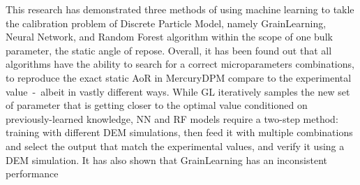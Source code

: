 This research has demonstrated three methods of using machine learning to takle the calibration problem of Discrete Particle Model, namely GrainLearning, Neural Network, and Random Forest algorithm within the scope of one bulk parameter, the static angle of repose. Overall, it has been found out that all algorithms have the ability to search for a correct microparameters combinations, to reproduce the exact static AoR in MercuryDPM compare to the experimental value~-~albeit in vastly different ways. While GL iteratively samples the new set of parameter that is getting closer to the optimal value conditioned on previously-learned knowledge, NN and RF models require a two-step method: training with different DEM simulations, then feed it with multiple combinations and select the output that match the experimental values, and verify it using a DEM simulation. It has also shown that GrainLearning has an inconsistent performance 